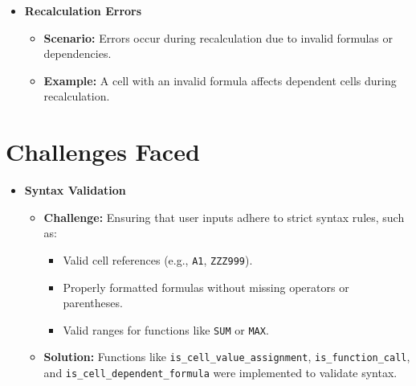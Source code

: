 \documentclass{article}
\begin{document}
\begin{itemize}
    \item \textbf{Recalculation Errors}
    \begin{itemize}
        \item \textbf{Scenario:} Errors occur during recalculation due to invalid formulas or dependencies.
        \item \textbf{Example:} A cell with an invalid formula affects dependent cells during recalculation.
    \end{itemize}
\end{itemize}



\section{Challenges Faced}
\begin{itemize}
    \item \textbf{Syntax Validation}
    \begin{itemize}
        \item \textbf{Challenge:} Ensuring that user inputs adhere to strict syntax rules, such as:
        \begin{itemize}
            \item Valid cell references (e.g., \texttt{A1}, \texttt{ZZZ999}).
            \item Properly formatted formulas without missing operators or parentheses.
            \item Valid ranges for functions like \texttt{SUM} or \texttt{MAX}.
        \end{itemize}
        \item \textbf{Solution:}
        Functions like \texttt{is\_cell\_value\_assignment}, \texttt{is\_function\_call}, and \texttt{is\_cell\_dependent\_formula} were implemented to validate syntax.
    \end{itemize}


\end{itemize}
\end{document}
